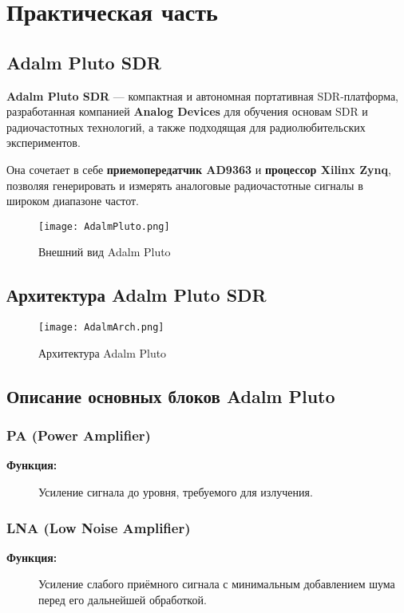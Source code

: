 \chapter{Практическая часть}
\label{ch:chap2}

\section*{Adalm Pluto SDR}

\textbf{Adalm Pluto SDR} --- компактная и автономная портативная SDR-платформа, 
разработанная компанией \textbf{Analog Devices} для обучения основам SDR и радиочастотных технологий, 
а также подходящая для радиолюбительских экспериментов. 

Она сочетает в себе \textbf{приемопередатчик AD9363} и \textbf{процессор Xilinx Zynq}, позволяя генерировать 
и измерять аналоговые радиочастотные сигналы в широком диапазоне частот. 

\begin{figure}[H]
    \centering
    \texttt{[image: AdalmPluto.png]}
    \caption{Внешний вид Adalm Pluto}
\end{figure}

\section*{Архитектура Adalm Pluto SDR}

\begin{figure}[H]
    \centering
    \texttt{[image: AdalmArch.png]}
    \caption{Архитектура Adalm Pluto}
\end{figure}

\section*{Описание основных блоков Adalm Pluto}

\subsection*{\textbf{PA (Power Amplifier)}}
\begin{description}
  \item[\textbf{Функция:}] Усиление сигнала до уровня, требуемого для излучения.
\end{description}

\subsection*{\textbf{LNA (Low Noise Amplifier)}}
\begin{description}
  \item[\textbf{Функция:}] Усиление слабого приёмного сигнала с минимальным добавлением шума перед его дальнейшей обработкой.
\end{description}

